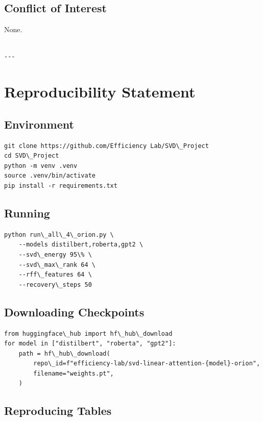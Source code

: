 \subsection{Conflict of Interest}

None.
\begin{lstlisting}

---
\end{lstlisting}


\section{Reproducibility Statement}

\subsection{Environment}

\begin{lstlisting}
git clone https://github.com/Efficiency Lab/SVD\_Project
cd SVD\_Project
python -m venv .venv
source .venv/bin/activate
pip install -r requirements.txt
\end{lstlisting}

\subsection{Running}

\begin{lstlisting}
python run\_all\_4\_orion.py \
    --models distilbert,roberta,gpt2 \
    --svd\_energy 95\% \
    --svd\_max\_rank 64 \
    --rff\_features 64 \
    --recovery\_steps 50
\end{lstlisting}

\subsection{Downloading Checkpoints}

\begin{lstlisting}
from huggingface\_hub import hf\_hub\_download
for model in ["distilbert", "roberta", "gpt2"]:
    path = hf\_hub\_download(
        repo\_id=f"efficiency-lab/svd-linear-attention-{model}-orion",
        filename="weights.pt",
    )
\end{lstlisting}

\subsection{Reproducing Tables}

